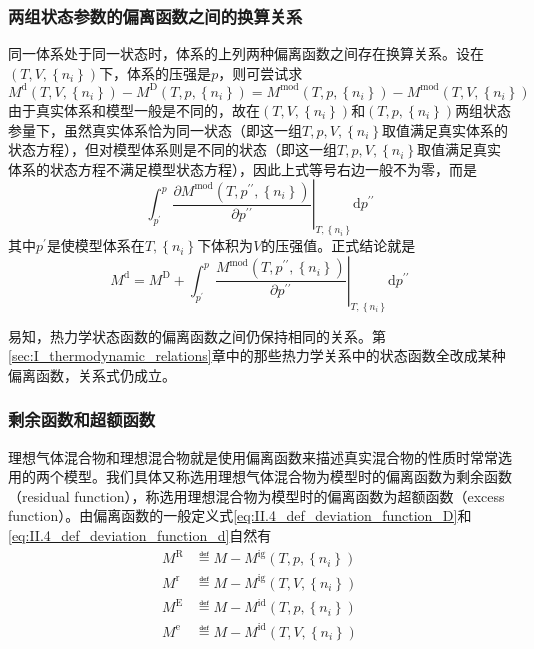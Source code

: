 \documentclass[main.tex]{subfiles}
\begin{document}
\subsubsection{两组状态参数的偏离函数之间的换算关系}
同一体系处于同一状态时，体系的上列两种偏离函数之间存在换算关系。设在$\left(T,V,\left\{n_i\right\}\right)$下，体系的压强是$p$，则可尝试求
\[M^\text{d}\left(T,V,\left\{n_i\right\}\right)-M^\text{D}\left(T,p,\left\{n_i\right\}\right)=M^\text{mod}\left(T,p,\left\{n_i\right\}\right)-M^\text{mod}\left(T,V,\left\{n_i\right\}\right)\]
由于真实体系和模型一般是不同的，故在$\left(T,V,\left\{n_i\right\}\right)$和$\left(T,p,\left\{n_i\right\}\right)$两组状态参量下，虽然真实体系恰为同一状态（即这一组$T,p,V,\left\{n_i\right\}$取值满足真实体系的状态方程），但对模型体系则是不同的状态（即这一组$T,p,V,\left\{n_i\right\}$取值满足真实体系的状态方程不满足模型状态方程），因此上式等号右边一般不为零，而是
\[\int_{p^\prime}^p\left.\frac{\partial M^\text{mod}\left(T,p^{\prime\prime},\left\{n_i\right\}\right)}{\partial p^{\prime\prime}}\right|_{T,\left\{n_i\right\}}\mathrm{d}p^{\prime\prime}\]
其中$p^\prime$是使模型体系在$T,\left\{n_i\right\}$下体积为$V$的压强值。正式结论就是
\begin{equation}\label{eq:II.4_deviation_function_relation}
    M^\text{d}=M^\text{D}+\int_{p^\prime}^p\left.\frac{M^\text{mod}\left(T,p^{\prime\prime},\left\{n_i\right\}\right)}{\partial p^{\prime\prime}}\right|_{T,\left\{n_i\right\}}\mathrm{d}p^{\prime\prime}
\end{equation}


易知，热力学状态函数的偏离函数之间仍保持相同的关系。第\ref{sec:I_thermodynamic_relations}章中的那些热力学关系中的状态函数全改成某种偏离函数，关系式仍成立。

\subsubsection{剩余函数和超额函数}
理想气体混合物和理想混合物就是使用偏离函数来描述真实混合物的性质时常常选用的两个模型。我们具体又称选用理想气体混合物为模型时的偏离函数为剩余函数（residual function），称选用理想混合物为模型时的偏离函数为超额函数（excess function）。由偏离函数的一般定义式\eqref{eq:II.4_def_deviation_function_D}和\eqref{eq:II.4_def_deviation_function_d}自然有
\begin{align}
    M^\text{R} & \eqdef M-M^\text{ig}\left(T,p,\left\{n_i\right\}\right) \\
    M^\text{r} & \eqdef M-M^\text{ig}\left(T,V,\left\{n_i\right\}\right) \\
    M^\text{E} & \eqdef M-M^\text{id}\left(T,p,\left\{n_i\right\}\right) \\
    M^\text{e} & \eqdef M-M^\text{id}\left(T,V,\left\{n_i\right\}\right)
\end{align}
\end{document}
